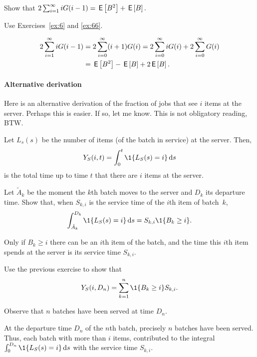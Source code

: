 \begin{exercise}\label{ex:ER}
  Show that $2 \sum_{i=1}^\infty i G(i-1)= \,\mathsf{E}\left[B^2\right] + \,\mathsf{E}\left[B\right].$
  \begin{hint}
    Use Exercises~\ref{ex:6} and \ref{ex:66}.
  \end{hint}
  \begin{solution}
\begin{equation*}
  \begin{split}
2 \sum_{i=1}^\infty i G(i-1) 
&=2\sum_{i=0}^\infty (i+1) G(i) 
=2\sum_{i=0}^\infty i G(i) +
2\sum_{i=0}^\infty G(i)\\
&= \,\mathsf{E}\left[B^2\right] - \,\mathsf{E}\left[B\right] + 2\,\mathsf{E}\left[B\right].
  \end{split}
\end{equation*}
  \end{solution}
\end{exercise}


\paragraph{Alternative derivation}
Here is an alternative derivation of the fraction of jobs that see $i$ items at the server. Perhaps this is easier. If so, let me know. This is not obligatory reading, BTW. 

Let $L_s(s)$ be the number of items (of the batch in service) at the server. Then, 
\begin{equation*}
  Y_S(i, t) = \int_0^t \1{L_S(s)=i} \d s
\end{equation*}
is the total time up to time $t$ that there are $i$ items at the server. 

\begin{exercise}
Let $\tilde A_k$ be the moment the $k$th batch moves to the server and $D_k$ its departure time. Show that, when $S_{k,i}$ is the service time of the $i$th item of batch~$k$,  
\begin{equation*}
  \int_{\tilde A_k}^{D_k} \1{L_S(s)=i} \d s = S_{k,i} \1{B_k \geq i}. 
\end{equation*}
\begin{solution}
Only if $B_k \geq i$ there can be an $i$th item of the batch, and the time this $i$th item spends at the server is its service time $S_{k,i}$.   
\end{solution}
\end{exercise}


\begin{exercise}
Use the previous exercise to show that 
\begin{equation*}
  Y_S(i, D_n) = \sum_{k=1}^n \1{B_k\geq i} S_{k,i}.
\end{equation*}
\begin{hint}
  Observe that $n$ batches have been served at time $D_n$.
\end{hint}
\begin{solution}
At the departure time $D_n$ of the $n$th batch, precisely $n$ batches have been served. Thus, each batch with more than $i$ items, contributed to the integral $\int_0^{D_n} \1{L_S(s) =i} \d s$ with the service time $S_{k,i}$. 
\end{solution}
\end{exercise}


